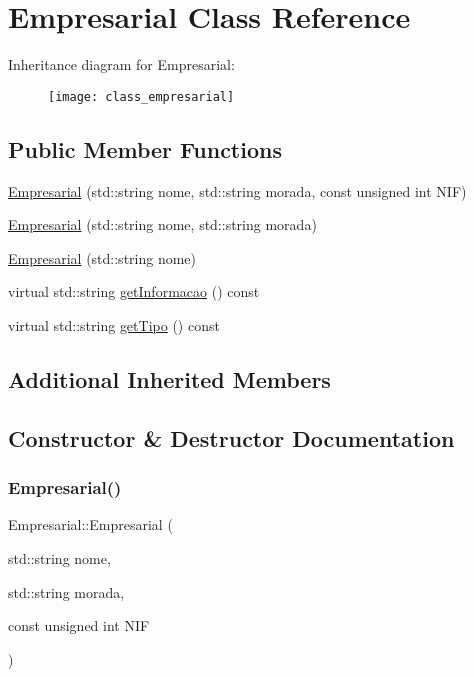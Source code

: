\hypertarget{class_empresarial}{}\section{Empresarial Class Reference}
\label{class_empresarial}
Inheritance diagram for Empresarial\+:\begin{figure}[H]
\begin{center}
\leavevmode
\texttt{[image: class\_empresarial]}
\end{center}
\end{figure}
\subsection*{Public Member Functions}
\begin{DoxyCompactItemize}
\item 
\hyperlink{class_empresarial_abc2cfe8386b61448ab193977024fe821}{Empresarial} (std\+::string nome, std\+::string morada, const unsigned int N\+IF)
\item 
\hyperlink{class_empresarial_a8f89fe5f36da7bf48548ff67b27e547f}{Empresarial} (std\+::string nome, std\+::string morada)
\item 
\hyperlink{class_empresarial_a1a87eb7f12020af2c8ee8e942f3b8344}{Empresarial} (std\+::string nome)
\item 
virtual std\+::string \hyperlink{class_empresarial_a28090b6b3db16b6b7ba03d6308c2c309}{get\+Informacao} () const
\item 
virtual std\+::string \hyperlink{class_empresarial_a3d5d89f5a446fdcca0955d289592edaf}{get\+Tipo} () const
\end{DoxyCompactItemize}
\subsection*{Additional Inherited Members}


\subsection{Constructor \& Destructor Documentation}
\hypertarget{class_empresarial_abc2cfe8386b61448ab193977024fe821}{}\label{class_empresarial_abc2cfe8386b61448ab193977024fe821} 
\subsubsection{\texorpdfstring{Empresarial()}{Empresarial()}\hspace{0.1cm}{\footnotesize\ttfamily [1/3]}}
{\footnotesize\ttfamily Empresarial\+::\+Empresarial (\begin{DoxyParamCaption}\item[{std\+::string}]{nome,  }\item[{std\+::string}]{morada,  }\item[{const unsigned int}]{N\+IF }\end{DoxyParamCaption})}

